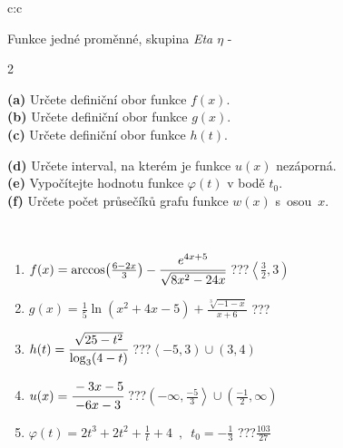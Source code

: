 \documentclass[10pt]{report}
\begin{document}
\begin{tabular}{c:c}
\begin{minipage}[c][104.5mm][t]{0.5\linewidth}
\begin{center}
\vspace{7mm}
{\huge Funkce jedné proměnné, skupina \textit{Eta $\eta$} -}\\[5mm]
\begin{minipage}{0.95\linewidth}
\begin{center}
{\small \begin{multicols}{2} \raggedright
\textbf{(a)} Určete definiční obor funkce \(f(x)\). \\[1mm]
\textbf{(b)} Určete definiční obor funkce \(g(x)\). \\[1mm]
\textbf{(c)} Určete definiční obor funkce \(h(t)\). \par \columnbreak
\textbf{(d)} Určete interval, na kterém je funkce \(u(x)\) nezáporná. \\[1mm]
\textbf{(e)} Vypočítejte hodnotu funkce \(\varphi(t)\) v bodě \(t_0\). \\[1mm]
\textbf{(f)} Určete počet průsečíků grafu funkce \(w(x)\) s~osou~\(x\). \\[1mm]
\end{multicols}
}
\end{center}
\end{minipage}
\\[4mm]
\begin{minipage}{0.79\linewidth}
\begin{center}
\begin{varwidth}{\linewidth}
\begin{enumerate}
\small
\item $f(x) = \arccos\!\left( \frac{6-2x}{3} \right) - \cfrac{e^{4x+5}}{\sqrt{8x^2-24x}}$\quad \dotfill\; ???\;\dotfill \quad $\left\langle\frac{3}{2} , 3\right)$
\item $g(x) = \frac{1}{5} \ln{\!(x^2+4x-5)}+\frac{\sqrt[3]{-1-x}}{x+6}$\quad \dotfill\; ???\;\dotfill {}
\item $h(t) = \cfrac{\sqrt{25-t^2}}{\log_3(4-t)}$\quad \dotfill\; ???\;\dotfill \quad $\left\langle-5 , 3\right)\cup\left(3 , 4\right)$
\item $u(x) = \cfrac{-3x-5}{-6x-3}$\quad \dotfill\; ???\;\dotfill \quad $\left(-\infty , \frac{-5}{3}\right\rangle\cup\left(\frac{-1}{2} , \infty\right)$
\item $\varphi(t) = 2t^3+2t^2+\frac{1}{t}+4 \enspace , \enspace t_0=-\frac{1}{3}$\quad \dotfill\; ???\;\dotfill \quad $\frac{103}{27}$

\end{enumerate}
\end{varwidth}
\end{center}
\end{minipage}
\end{center}
\end{minipage}
\end{tabular}
\end{document}
